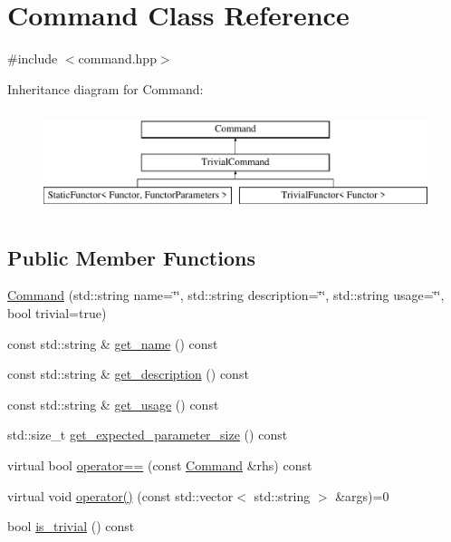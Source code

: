 \hypertarget{class_command}{}\section{Command Class Reference}
\label{class_command}


{\ttfamily \#include $<$command.\+hpp$>$}

Inheritance diagram for Command\+:\begin{figure}[H]
\begin{center}
\leavevmode
\includegraphics[height=3.000000cm]{class_command}
\end{center}
\end{figure}
\subsection*{Public Member Functions}
\begin{DoxyCompactItemize}
\item 
\mbox{\hyperlink{class_command_a3cf1e15c821380f4a12e8bd9da620da9}{Command}} (std\+::string name=\char`\"{}\char`\"{}, std\+::string description=\char`\"{}\char`\"{}, std\+::string usage=\char`\"{}\char`\"{}, bool trivial=true)
\item 
const std\+::string \& \mbox{\hyperlink{class_command_afc03c74d1f90127326015faa8f5f4866}{get\+\_\+name}} () const
\item 
const std\+::string \& \mbox{\hyperlink{class_command_a6352942f26bc7f233584ee707ac46eb1}{get\+\_\+description}} () const
\item 
const std\+::string \& \mbox{\hyperlink{class_command_a0a07c4f1b9b78074268653129bbd6cbb}{get\+\_\+usage}} () const
\item 
std\+::size\+\_\+t \mbox{\hyperlink{class_command_ae1e1b915dfc4bbb2633c1b5e331f83e1}{get\+\_\+expected\+\_\+parameter\+\_\+size}} () const
\item 
virtual bool \mbox{\hyperlink{class_command_a264fd55e96d28e7687a42108539bd9cf}{operator==}} (const \mbox{\hyperlink{class_command}{Command}} \&rhs) const
\item 
virtual void \mbox{\hyperlink{class_command_a325860d97ad7b70553e3097321ee9952}{operator()}} (const std\+::vector$<$ std\+::string $>$ \&args)=0
\item 
bool \mbox{\hyperlink{class_command_a2b9c29afe3b2fd50ef1c8664eec56aec}{is\+\_\+trivial}} () const
\end{DoxyCompactItemize}
